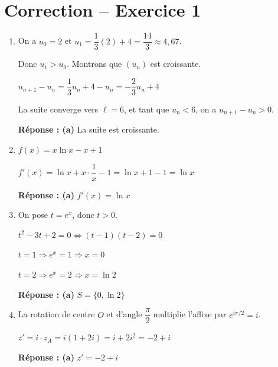 \section*{Correction -- Exercice 1}

\begin{enumerate}
\item On a $u_0 = 2$ et $u_1 = \dfrac{1}{3}(2) + 4 = \dfrac{14}{3} \approx 4{,}67$.

Donc $u_1 > u_0$. Montrons que $(u_n)$ est croissante.

$u_{n+1} - u_n = \dfrac{1}{3} u_n + 4 - u_n = -\dfrac{2}{3} u_n + 4$

La suite converge vers $\ell = 6$, et tant que $u_n < 6$, on a $u_{n+1} - u_n > 0$.

\textbf{Réponse : (a)} La suite est croissante.

\item $f(x) = x \ln x - x + 1$

$f'(x) = \ln x + x \cdot \dfrac{1}{x} - 1 = \ln x + 1 - 1 = \ln x$

\textbf{Réponse : (a)} $f'(x) = \ln x$

\item On pose $t = e^x$, donc $t > 0$.

$t^2 - 3t + 2 = 0 \iff (t-1)(t-2) = 0$

$t = 1 \Rightarrow e^x = 1 \Rightarrow x = 0$

$t = 2 \Rightarrow e^x = 2 \Rightarrow x = \ln 2$

\textbf{Réponse : (a)} $S = \{0, \ln 2\}$

\item La rotation de centre $O$ et d'angle $\dfrac{\pi}{2}$ multiplie l'affixe par $e^{i\pi/2} = i$.

$z' = i \cdot z_A = i(1 + 2i) = i + 2i^2 = -2 + i$

\textbf{Réponse : (a)} $z' = -2 + i$
\end{enumerate}

